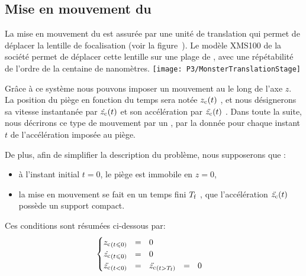 {\AjouteLigne\AjouteLigne}


\subsection{Mise en mouvement du \pd}\label{sec:MisEnMouvementPD}
La mise en mouvement du \pd est assurée par une unité de translation qui permet de déplacer la lentille de focalisation (voir la figure~). Le modèle XMS100 de la société  permet de déplacer cette lentille sur une plage de , avec une répétabilité de l'ordre de la centaine de nanomètres.
%
\bfighs
\texttt{[image: P3/MonsterTranslationStage]}
\label{fig:TranslationStage}
\efigh

\casse

\RetireLigne
\RetireLigne
\RetireLigne
\RetireLigne
\RetireLigne
\RetireLigne

Grâce à ce système nous pouvons imposer un mouvement au \pd le long de l'axe $z$. La position du piège en fonction du temps sera notée ${{z_{\rm c}}(t)}$%
%
, et nous désignerons sa vitesse instantanée par ${{\dot{{z_{\rm c}}}}(t)}$ %
%
et son accélération par ${{\ddot{{z_{\rm c}}}}(t)}$%
%
.
Dans toute la suite, nous décrirons ce type de mouvement par un \emph{\pacc}, \cad par la donnée pour chaque instant $t$ de l'accélération imposée au piège. 

De plus, afin de simplifier la description du problème, nous supposerons que :
\begin{itemize}
	\item à l'instant initial $t=0$, le piège est immobile en $z=0$,
	\item la mise en mouvement se fait en un temps fini ${T_{\rm f}}$%
	, \cad que l'accélération ${{\ddot{{z_{\rm c}}}}(t)}$ possède un support compact.
\end{itemize}
Ces conditions sont résumées ci-dessous par:
\begin{equation}
\begin{cases}
	\zc_{(t\leqslant0)}   ~~ = ~~  0& \\
	\dzc_{(t\leqslant0)}  ~~ = ~~  0& \\
	\ddzc_{(t<0)} ~~ = ~~ \ddzc_{(t>\tfin)} ~~ = ~~ 0&
\end{cases}
	\label{eq:ZcDzcIni}
\end{equation}

